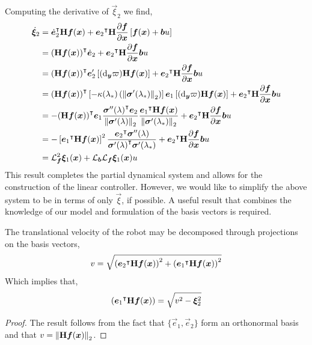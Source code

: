 \documentclass[oneside, 11pt]{book}
\begin{document}
Computing the derivative of $\vec{\xi}_2$ we find,
\begin{align*}
    \dot{\bm{\xi}}_2
                &=  {\dot{\bm{e}}_2}^{\intercal}\mathbf{H}\bm{f}(\bm{x})
                    +
                    {\bm{e}_2}^{\intercal}\mathbf{H}\frac{\partial\bm{f}}{\partial\bm{x}}\left[\bm{f}(\bm{x}) + \bm{b}u\right]\\
                &=  {(\mathbf{H}\bm{f}(\bm{x}))}^{\intercal}\dot{\bm{e}}_2
                    +
                    {\bm{e}_2}^{\intercal}\mathbf{H}\frac{\partial\bm{f}}{\partial\bm{x}} \bm{b} u \\
                &=  {(\mathbf{H}\bm{f}(\bm{x}))}^{\intercal}\bm{e}'_2\left[(\mathop{}\!\mathrm{d}_{\bm{y}}\varpi)\mathbf{H}\bm{f}(\bm{x}) \right]
                    +
                    {\bm{e}_2}^{\intercal}\mathbf{H}\frac{\partial\bm{f}}{\partial\bm{x}} \bm{b} u \\
                &=  {(\mathbf{H}\bm{f}(\bm{x}))}^{\intercal}\left[-\kappa(\lambda_*)\left(\mathop{}\!\left\|\bm{\sigma}'(\lambda_*)\right\|_2 \right)\right]\bm{e}_1\left[(\mathop{}\!\mathrm{d}_{\bm{y}}\varpi)\mathbf{H}\bm{f}(\bm{x})\right]
                    +
                    {\bm{e}_2}^{\intercal}\mathbf{H}\frac{\partial\bm{f}}{\partial\bm{x}}\bm{b} u\\
                &=  -{(\mathbf{H}\bm{f}(\bm{x}))}^{\intercal}\bm{e}_1 \frac{{\bm{\sigma}''(\lambda)}^{\intercal}\bm{e}_2}{\mathop{}\!\left\|\bm{\sigma}'(\lambda)\right\|_2}\frac{{\bm{e}_1}^{\intercal}\mathbf{H}\bm{f}(\bm{x})}{\mathop{}\!\left\|\bm{\sigma}'(\lambda_*)\right\|_2}
                    +
                    {\bm{e}_2}^{\intercal}\mathbf{H}\frac{\partial\bm{f}}{\partial\bm{x}}\bm{b} u\\
                &=  -\left[{\bm{e}_1}^{\intercal}\mathbf{H}\bm{f}(\bm{x})\right]^2 \frac{{\bm{e}_2}^{\intercal}\bm{\sigma}''(\lambda)}{{\bm{\sigma}'(\lambda)}^{\intercal}\bm{\sigma}'(\lambda_*)}
                    +
                    {\bm{e}_2}^{\intercal}\mathbf{H}\frac{\partial\bm{f}}{\partial\bm{x}}\bm{b} u\\
                &=  \mathcal{L}_{\bm{f}}^2\bm{\xi}_1(\bm{x}) + \mathcal{L}_{\bm{b}}\mathcal{L}_{\bm{f}}\bm{\xi}_1(\bm{x}) u
\end{align*}
This result completes the partial dynamical system and allows for the construction of the linear controller. However, we would like to simplify the above system to be in terms of only $\vec{\xi}$, if possible. A useful result that combines the knowledge of our model and formulation of the basis vectors is required.
\begin{lemma}
    The translational velocity of the robot may be decomposed through projections on the basis vectors,
    $$
        v = \sqrt{ \left({\bm{e}_2}^{\intercal}\mathbf{H}\bm{f}(\bm{x})\right)^2 + \left({\bm{e}_1}^{\intercal}\mathbf{H}\bm{f}(\bm{x})\right)^2 }
    $$
    Which implies that,
    $$
        \left({\bm{e}_1}^{\intercal}\mathbf{H}\bm{f}(\bm{x})\right) = \sqrt{v^2 - \bm{\xi}_2^2}
    $$
\end{lemma}
\begin{proof}
    The result follows from the fact that $\{ \vec{e}_1, \vec{e}_2 \}$ form an orthonormal basis and that $v = \mathop{}\!\left\|\mathbf{H}\bm{f}(\bm{x})\right\|_2$.
\end{proof}
\end{document}
